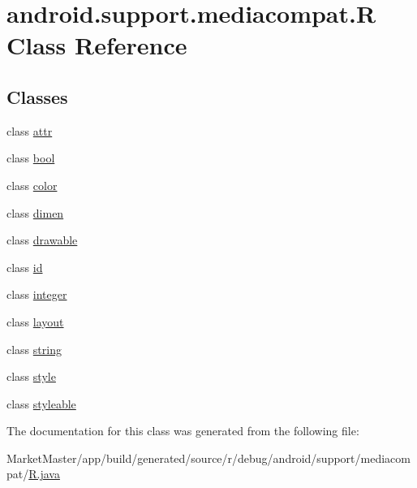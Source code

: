 \hypertarget{classandroid_1_1support_1_1mediacompat_1_1R}{}\section{android.\+support.\+mediacompat.\+R Class Reference}
\label{classandroid_1_1support_1_1mediacompat_1_1R}
\subsection*{Classes}
\begin{DoxyCompactItemize}
\item 
class \mbox{\hyperlink{classandroid_1_1support_1_1mediacompat_1_1R_1_1attr}{attr}}
\item 
class \mbox{\hyperlink{classandroid_1_1support_1_1mediacompat_1_1R_1_1bool}{bool}}
\item 
class \mbox{\hyperlink{classandroid_1_1support_1_1mediacompat_1_1R_1_1color}{color}}
\item 
class \mbox{\hyperlink{classandroid_1_1support_1_1mediacompat_1_1R_1_1dimen}{dimen}}
\item 
class \mbox{\hyperlink{classandroid_1_1support_1_1mediacompat_1_1R_1_1drawable}{drawable}}
\item 
class \mbox{\hyperlink{classandroid_1_1support_1_1mediacompat_1_1R_1_1id}{id}}
\item 
class \mbox{\hyperlink{classandroid_1_1support_1_1mediacompat_1_1R_1_1integer}{integer}}
\item 
class \mbox{\hyperlink{classandroid_1_1support_1_1mediacompat_1_1R_1_1layout}{layout}}
\item 
class \mbox{\hyperlink{classandroid_1_1support_1_1mediacompat_1_1R_1_1string}{string}}
\item 
class \mbox{\hyperlink{classandroid_1_1support_1_1mediacompat_1_1R_1_1style}{style}}
\item 
class \mbox{\hyperlink{classandroid_1_1support_1_1mediacompat_1_1R_1_1styleable}{styleable}}
\end{DoxyCompactItemize}


The documentation for this class was generated from the following file\+:\begin{DoxyCompactItemize}
\item 
Market\+Master/app/build/generated/source/r/debug/android/support/mediacompat/\mbox{\hyperlink{debug_2android_2support_2mediacompat_2R_8java}{R.\+java}}\end{DoxyCompactItemize}
